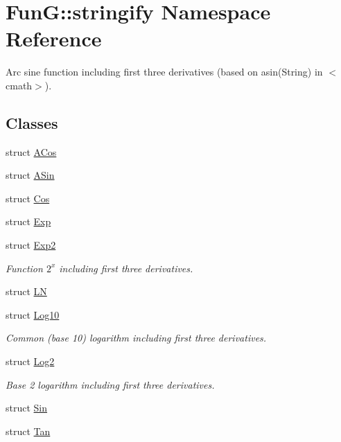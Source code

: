\hypertarget{namespaceFunG_1_1stringify}{\section{Fun\-G\-:\-:stringify Namespace Reference}
\label{namespaceFunG_1_1stringify}
}


Arc sine function including first three derivatives (based on asin(\-String) in $<$cmath$>$).  


\subsection*{Classes}
\begin{DoxyCompactItemize}
\item 
struct \hyperlink{structFunG_1_1stringify_1_1ACos}{A\-Cos}
\item 
struct \hyperlink{structFunG_1_1stringify_1_1ASin}{A\-Sin}
\item 
struct \hyperlink{structFunG_1_1stringify_1_1Cos}{Cos}
\item 
struct \hyperlink{structFunG_1_1stringify_1_1Exp}{Exp}
\item 
struct \hyperlink{structFunG_1_1stringify_1_1Exp2}{Exp2}
\begin{DoxyCompactList}\small\item\em Function $2^x$ including first three derivatives. \end{DoxyCompactList}\item 
struct \hyperlink{structFunG_1_1stringify_1_1LN}{L\-N}
\item 
struct \hyperlink{structFunG_1_1stringify_1_1Log10}{Log10}
\begin{DoxyCompactList}\small\item\em Common (base 10) logarithm including first three derivatives. \end{DoxyCompactList}\item 
struct \hyperlink{structFunG_1_1stringify_1_1Log2}{Log2}
\begin{DoxyCompactList}\small\item\em Base 2 logarithm including first three derivatives. \end{DoxyCompactList}\item 
struct \hyperlink{structFunG_1_1stringify_1_1Sin}{Sin}
\item 
struct \hyperlink{structFunG_1_1stringify_1_1Tan}{Tan}
\end{DoxyCompactItemize}
